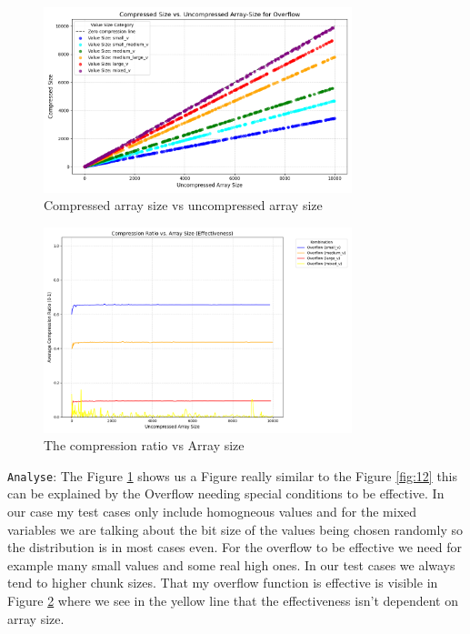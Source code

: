 \documentclass[11pt, a4paper]{article}
\begin{document}
	\begin{figure}[H]%
		\centering
		\includegraphics[width=0.8\textwidth]{Grafics/Overflow/Overflowefficency.png}
		\caption{Compressed array size vs uncompressed array size}
		\label{fig:21}
	\end{figure}
	\begin{figure}[H]%
		\centering
		\includegraphics[width=0.8\textwidth]{Grafics/Overflow/OverflowEffectiveness.png}
		\caption{The compression ratio vs Array size}
		\label{fig:22}
	\end{figure}
	\texttt{Analyse}: The Figure \ref{fig:21} shows us a Figure really similar to the Figure \ref{fig:12} this can be explained by the Overflow needing special conditions to be effective. In our case my test cases only include homogneous values and for the mixed variables we are talking about the bit size of the values being chosen randomly so the distribution is in most cases even. For the overflow to be effective we need for example many small values and some real high ones. In our test cases we always tend to higher chunk sizes. That my overflow function is effective is visible in Figure \ref{fig:22} where we see in the yellow line that the effectiveness isn't dependent on array size.
	
\end{document}
